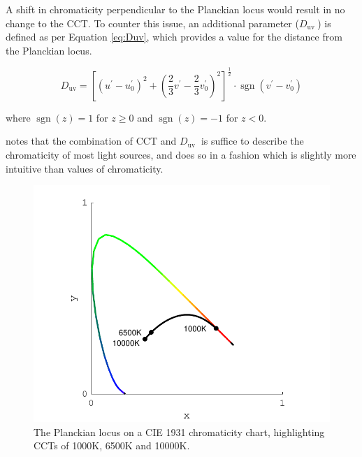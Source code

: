 A shift in chromaticity perpendicular to the Planckian locus would result in no change to the \gls{CCT}. To counter this issue, an additional parameter ($D_{\text {uv }}$) is defined \citep{ohno_practical_2014} as per Equation \ref{eq:Duv}, which provides a value for the distance from the Planckian locus.

\begin{equation}
D_{\mathrm{uv}}=\left[\left(u^{\prime}-u_{0}^{\prime}\right)^{2}+\left(\frac{2}{3} v^{\prime}-\frac{2}{3} v_{0}^{\prime}\right)^{2}\right]^{\frac{1}{2}} \cdot \operatorname{sgn}\left(v^{\prime}-v_{0}^{\prime}\right)
\label{eq:Duv}
\end{equation}

where $\operatorname{sgn}(z)=1$ for $z\geq0$ and $\operatorname{sgn}(z)=-1$ for $z<0$.

\citet{ohno_practical_2014} notes that the combination of \gls{CCT} and $D_{\text {uv }}$ is suffice to describe the chromaticity of most light sources, and does so in a fashion which is slightly more intuitive than values of chromaticity.

\begin{figure}[htbp]
\includegraphics[max width=\textwidth]{figs/LitRev/BBR.pdf}
\caption{The Planckian locus on a \gls{CIE} 1931 chromaticity chart, highlighting \glspl{CCT} of 1000K, 6500K and 10000K.}
\label{fig:BBR}
\end{figure}

\clearpage